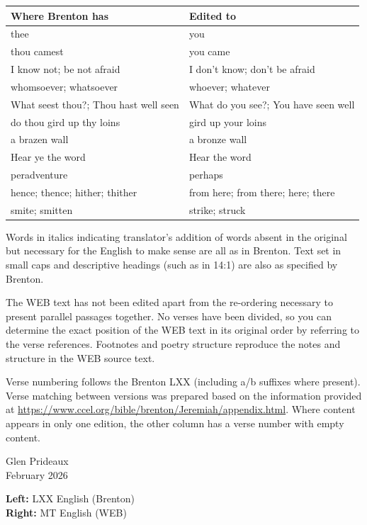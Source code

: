 \begin{center}
  \begin{tabular}{l l}
  \hline
  Where Brenton has&Edited to\\
  \hline
  thee&you\\
  thou camest&you came\\
  I know not; be not afraid&I don't know; don't be afraid\\
  whomsoever; whatsoever&whoever; whatever\\
  What seest thou?; Thou hast well seen&What do you see?; You have seen well\\
  do thou gird up thy loins&gird up your loins\\
  a brazen wall&a bronze wall\\
    Hear ye the word&Hear the word\\
    peradventure&perhaps\\
    hence; thence; hither; thither&from here; from there; here; there\\
    smite; smitten&strike; struck\\
\hline
\end{tabular}
\end{center}
\hspace{1.5em} Words in italics indicating translator's addition of words absent in the original but necessary for the English to make sense are all as in Brenton. Text set in small caps and descriptive headings (such as in 14:1) are also as specified by Brenton.

\hspace{1.5em} The WEB text has not been edited apart from the re-ordering necessary to present parallel passages together. No verses have been divided, so you can determine the exact position of the WEB text in its original order by referring to the verse references. Footnotes and poetry structure reproduce the notes and structure in the  WEB source text.

\hspace{1.5em} Verse numbering follows
the Brenton LXX (including a/b suffixes where present). Verse matching between versions was prepared based on the information provided at \url{https://www.ccel.org/bible/brenton/Jeremiah/appendix.html}. Where content appears in only one edition, the other column has a verse number with empty content.

\bigskip
\noindent Glen Prideaux\\
February 2026

\bigskip
\noindent\textbf{Left:} LXX English (Brenton)\\
\textbf{Right:} MT English (WEB)